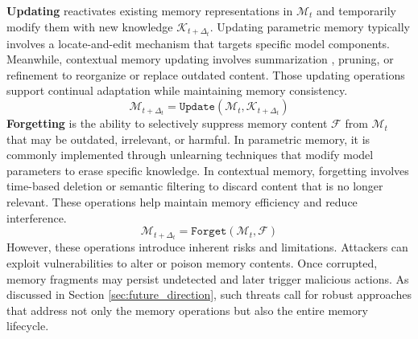 \documentclass[manuscript,screen]{acmart}
\begin{document}
\textbf{Updating} \citep{kiley2022mechanisms} reactivates existing memory representations in $\mathcal{M}_t$ and temporarily modify them with new knowledge $\mathcal{K}_{t+\Delta_{t}}$. Updating parametric memory typically involves a locate-and-edit mechanism \citep{fang2025alphaedit} that targets specific model components. Meanwhile, contextual memory updating involves summarization \citep{zhong2024memorybank}, pruning, or refinement \citep{bae2022keep} to reorganize or replace outdated content. Those updating operations support continual adaptation while maintaining memory consistency. 
\begin{equation}
    \mathcal{M}_{t+\Delta_{t}} = \texttt{Update}(\mathcal{M}_{t}, \mathcal{K}_{t+\Delta_{t}})
\end{equation}
\textbf{Forgetting} \citep{davis2017biology, wang2009concept} is the ability to selectively suppress memory content $\mathcal{F}$ from $\mathcal{M}_{t}$ that may be outdated, irrelevant, or harmful. In parametric memory, it is commonly implemented through unlearning techniques \citep{jia2024wagle, machine-unlearning-lina-2025} that modify model parameters to erase specific knowledge. In contextual memory, forgetting involves time-based deletion \citep{zhong2024memorybank} or semantic filtering \citep{wang2024machine} to discard content that is no longer relevant. These operations help maintain memory efficiency and reduce interference.
\begin{equation}
    \mathcal{M}_{t+\Delta_{t}} = \texttt{Forget}(\mathcal{M}_{t}, \mathcal{F})
\end{equation}
However, these operations introduce inherent risks and limitations. Attackers can exploit vulnerabilities to alter or poison memory contents. Once corrupted, memory fragments may persist undetected and later trigger malicious actions. As discussed in Section \ref{sec:future_direction}, such threats call for robust approaches that address not only the memory operations but also the entire memory lifecycle.
\end{document}
